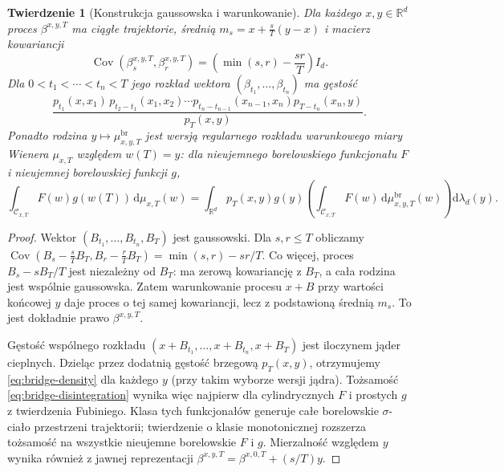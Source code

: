 \documentclass[11pt,a4paper,oneside]{report}
\numberwithin{equation}{chapter}
\theoremstyle{plain}
\newtheorem{twierdzenie}{Twierdzenie}[chapter]
\theoremstyle{definition}
\theoremstyle{remark}
\newcommand{\R}{\mathbb{R}}
\newcommand{\calC}{\mathcal{C}}
\newcommand{\dd}{\mathrm{d}}
\begin{document}
\begin{twierdzenie}[Konstrukcja gaussowska i warunkowanie]\label{thm:volIII:15:02}
\label{th:bridge-conditional}
Dla każdego $x,y\in\R^d$ proces $\beta^{x,y,T}$ ma
ciągłe trajektorie, średnią
$m_s=x+\frac{s}{T}(y-x)$ i macierz kowariancji
\[
\operatorname{Cov}(\beta_s^{x,y,T},\beta_r^{x,y,T})
 =\left(\min(s,r)-\frac{sr}{T}\right)I_d.
\]
Dla $0<t_1<\cdots<t_n<T$ jego rozkład wektora
$(\beta_{t_1},\ldots,\beta_{t_n})$ ma gęstość
\[
\frac{p_{t_1}(x,x_1)\,p_{t_2-t_1}(x_1,x_2)
 \cdots p_{t_n-t_{n-1}}(x_{n-1},x_n)
 p_{T-t_n}(x_n,y)}{p_T(x,y)}.
\tag{15.1}\label{eq:bridge-density}
\]
Ponadto rodzina $y\mapsto\mu_{x,y,T}^{\mathrm{br}}$
jest wersją regularnego rozkładu warunkowego miary Wienera
$\mu_{x,T}$ względem $w(T)=y$: dla nieujemnego borelowskiego
funkcjonału $F$ i nieujemnej borelowskiej funkcji $g$,
\[
 \int_{\calC_{x,T}} F(w)g(w(T))\,\dd\mu_{x,T}(w)
 =\int_{\R^d}p_T(x,y)g(y)
    \left(\int_{\calC_{x,T}} F(w)\,\dd\mu_{x,y,T}^{\mathrm{br}}(w)\right)
    \dd\lambda_d(y).
\tag{15.2}\label{eq:bridge-disintegration}
\]
\end{twierdzenie}
\begin{proof}
Wektor $(B_{t_1},\ldots,B_{t_n},B_T)$ jest gaussowski.
Dla $s,r\le T$ obliczamy
$\operatorname{Cov}(B_s-\frac sT B_T,
B_r-\frac rT B_T)=\min(s,r)-sr/T$.
Co więcej, proces $B_s-sB_T/T$ jest niezależny od $B_T$:
ma zerową kowariancję z $B_T$, a cała rodzina jest wspólnie
gaussowska. Zatem warunkowanie procesu $x+B$ przy wartości
końcowej $y$ daje proces o tej samej kowariancji, lecz z
podstawioną średnią $m_s$. To jest dokładnie prawo
$\beta^{x,y,T}$.

Gęstość wspólnego rozkładu
$(x+B_{t_1},\ldots,x+B_{t_n},x+B_T)$ jest iloczynem
jąder cieplnych. Dzieląc przez dodatnią gęstość brzegową
$p_T(x,y)$, otrzymujemy \eqref{eq:bridge-density} dla
każdego $y$ (przy takim wyborze wersji jądra).
Tożsamość \eqref{eq:bridge-disintegration} wynika więc
najpierw dla cylindrycznych $F$ i prostych $g$ z twierdzenia
Fubiniego. Klasa tych funkcjonałów generuje całe borelowskie
$\sigma$-ciało przestrzeni trajektorii; twierdzenie o klasie
monotonicznej rozszerza tożsamość na wszystkie nieujemne
borelowskie $F$ i $g$. Mierzalność względem $y$ wynika
również z jawnej reprezentacji
$\beta^{x,y,T}=\beta^{x,0,T}+(s/T)y$.
\end{proof}
\end{document}
